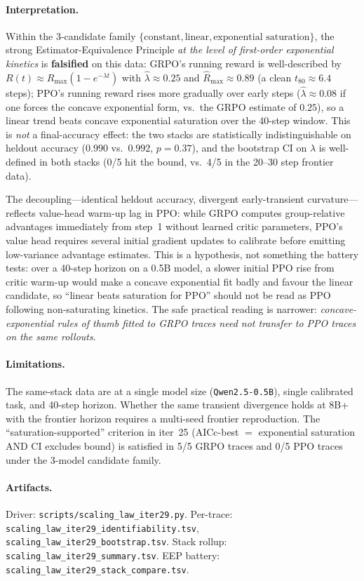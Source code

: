 \paragraph{Interpretation.}
Within the 3-candidate family $\{\text{constant}, \text{linear},
\text{exponential saturation}\}$, the strong Estimator-Equivalence
Principle \emph{at the level of first-order exponential kinetics} is
\textbf{falsified} on this data: GRPO's running reward is well-described by
$R(t)\approx R_{\max}(1-e^{-\lambda t})$ with $\hat\lambda\approx 0.25$
and $\hat R_{\max}\approx 0.89$ (a clean $t_{80}\approx 6.4$ steps);
PPO's running reward rises more gradually over early steps ($\hat\lambda
\approx 0.08$ if one forces the concave exponential form, vs.\ the GRPO
estimate of $0.25$), so a linear trend beats concave exponential
saturation over the 40-step window. This is
\emph{not} a final-accuracy effect: the two stacks are statistically
indistinguishable on heldout accuracy ($0.990$ vs.\ $0.992$, $p=0.37$),
and the bootstrap CI on $\lambda$ is well-defined in both stacks (0/5
hit the bound, vs.\ 4/5 in the 20--30 step frontier data).

The decoupling---identical heldout accuracy, divergent early-transient
curvature---reflects value-head warm-up lag in PPO: while GRPO computes
group-relative advantages immediately from step~1 without learned critic
parameters, PPO's value head requires several initial gradient updates
to calibrate before emitting low-variance advantage estimates.  This is
a hypothesis, not something the battery tests: over a 40-step horizon on
a 0.5B model, a slower initial PPO rise from critic warm-up would make a
concave exponential fit badly and favour the linear candidate, so
``linear beats saturation for PPO'' should not be read as PPO following
non-saturating kinetics.  The safe practical reading is narrower:
\emph{concave-exponential rules of thumb fitted to GRPO traces need not
transfer to PPO traces on the same rollouts}.

\paragraph{Limitations.}
The same-stack data are at a single model size (\texttt{Qwen2.5-0.5B}),
single calibrated task, and 40-step horizon. Whether the same transient
divergence holds at 8B+ with the frontier horizon requires a multi-seed
frontier reproduction. The ``saturation-supported'' criterion in
iter~25 (AICc-best $=$ exponential saturation AND CI excludes bound) is
satisfied in 5/5 GRPO traces and 0/5 PPO traces under the 3-model
candidate family.

\paragraph{Artifacts.}
Driver: \texttt{scripts/scaling\_law\_iter29.py}.
Per-trace: \texttt{scaling\_law\_iter29\_identifiability.tsv},
\texttt{scaling\_law\_iter29\_bootstrap.tsv}.
Stack rollup: \texttt{scaling\_law\_iter29\_summary.tsv}.
EEP battery: \texttt{scaling\_law\_iter29\_stack\_compare.tsv}.